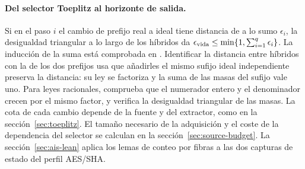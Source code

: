 \paragraph{Del selector Toeplitz al horizonte de salida.}
Si en el paso \(i\) el cambio de prefijo real a ideal tiene distancia de a lo sumo
\(\epsilon_i\), la desigualdad triangular a lo largo de los híbridos da
\(\epsilon_{\rm vida}\le\min\{1,\sum_{i=1}^q\epsilon_i\}\).
La inducción de la suma está comprobada en .
Identificar la distancia entre híbridos con la de los dos prefijos usa que
añadirles el mismo sufijo ideal independiente preserva la distancia: su ley
se factoriza y la suma de las masas del sufijo vale uno. Para leyes racionales,
 comprueba que el numerador entero y el
denominador crecen por el mismo factor, y  verifica la
desigualdad triangular de las masas. La cota de cada
cambio depende de la fuente y del extractor, como en la
sección~\ref{sec:toeplitz}. El tamaño necesario de la adquisición y el coste de la
dependencia del selector se calculan en la sección~\ref{sec:source-budget}.
La sección~\ref{sec:ais-lean} aplica los lemas de conteo por fibras a las
dos capturas de estado del perfil AES/SHA.
